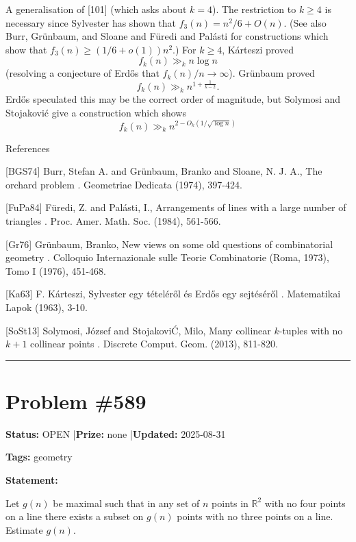 \documentclass{article}
\begin{document}
A generalisation of [101] (which asks about $k=4$). The restriction to $k\geq 4$ is necessary since Sylvester has shown that $f_3(n)= n^2/6+O(n)$. (See also Burr, Gr\"{u}nbaum, and Sloane \cite{BGS74} and F\"{u}redi and Pal\'{a}sti \cite{FuPa84} for constructions which show that $f_3(n)\geq(1/6+o(1))n^2$.) For $k\geq 4$, K\'{a}rteszi \cite{Ka63} proved\[f_k(n)\gg_k n\log n\](resolving a conjecture of Erd\H{o}s that $f_k(n)/n\to \infty$). Gr\"{u}nbaum \cite{Gr76} proved\[f_k(n) \gg_k n^{1+\frac{1}{k-2}}.\]Erd\H{o}s speculated this may be the correct order of magnitude, but Solymosi and Stojakovi\'{c} \cite{SoSt13} give a construction which shows\[f_k(n)\gg_k n^{2-O_k(1/\sqrt{\log n})}\]




References

[BGS74] Burr, Stefan A. and Gr\"{u}nbaum, Branko and Sloane, N. J. A., The orchard problem . Geometriae Dedicata (1974), 397-424.

[FuPa84] F\"{u}redi, Z. and Pal\'{a}sti, I., Arrangements of lines with a large number of triangles . Proc. Amer. Math. Soc. (1984), 561-566.

[Gr76] Gr\"{u}nbaum, Branko, New views on some old questions of combinatorial geometry . Colloquio Internazionale sulle Teorie Combinatorie (Roma, 1973), Tomo I (1976), 451-468.

[Ka63] F. K\'{a}rteszi, Sylvester egy t\'{e}tel\'{e}r\H{o}l \'{e}s Erd\H{o}s egy sejt\'{e}s\'{e}r\H{o}l . Matematikai Lapok (1963), 3-10.

[SoSt13] Solymosi, J\'{o}zsef and Stojakovi\'C, Milo\vS, Many collinear {$k$}-tuples with no {$k+1$} collinear points . Discrete Comput. Geom. (2013), 811-820.

\noindent\rule{\linewidth}{0.4pt}


\section{Problem \#589}
\label{prob:589}

\noindent\textbf{Status:} OPEN \quad|\quad \textbf{Prize:} none \quad|\quad \textbf{Updated:} 2025-08-31

\noindent\textbf{Tags:} geometry

\medskip

\noindent\textbf{Statement:}

Let $g(n)$ be maximal such that in any set of $n$ points in $\mathbb{R}^2$ with no four points on a line there exists a subset on $g(n)$ points with no three points on a line. Estimate $g(n)$.
\end{document}
